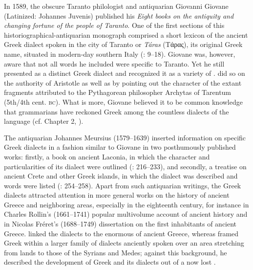 In 1589, the obscure Taranto philologist and antiquarian Giovanni Giovane (Latinized: Johannes Juvenis) published his \textit{Eight books on the antiquity and changing fortune of the people of Taranto}. One of the first sections of this historiographical-antiquarian monograph comprised a short lexicon of the ancient Greek dialect spoken in the city of Taranto or \textit{Táras} (Tάρας), its original Greek name, situated in modern-day southern Italy (\citealt{Giovane1589}: 9–18). Giovane was, however, aware that not all words he included were specific to Taranto. Yet he still presented  as a distinct Greek dialect and recognized it as a variety of . \citet[8--9]{Giovane1589} did so on the authority of Aristotle as well as by pointing out the  character of the extant fragments attributed to the Pythagorean philosopher Archytas of Tarentum (5th/4th cent. \textsc{bc}). What is more, Giovane believed it to be common knowledge that grammarians have reckoned  Greek among the countless dialects of the language (cf. Chapter 2, ).

The  antiquarian Johannes Meursius (1579–1639) inserted information on specific Greek dialects in a fashion similar to Giovane in two posthumously published works: firstly, a book on ancient Laconia, in which the  character and particularities of its dialect were outlined (\citealt{Meursius1661}: 216–233), and secondly, a treatise on ancient Crete and other Greek islands, in which the   dialect was described and  words were listed (\citealt{Meursius1675}: 254–258). Apart from such antiquarian writings, the Greek dialects attracted attention in more general works on the history of ancient Greece and neighboring areas, especially in the eighteenth century, for instance in Charles Rollin’s (1661–1741) popular multivolume account of ancient history and in Nicolas Fréret’s (1688–1749) dissertation on the first inhabitants of ancient Greece. \citet[395--396]{Rollin1731} linked the dialects to the enormous  of ancient Greece, whereas \citet[esp. 107--129]{Freret1809} framed Greek within a larger family of dialects anciently spoken over an area stretching from  lands to those of the Syrians and Medes; against this background, he described the development of Greek and its dialects out of a now lost .

